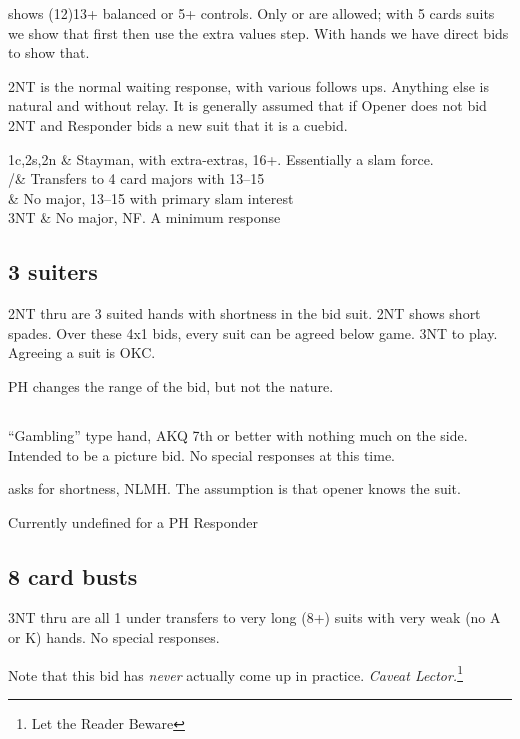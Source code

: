 \documentclass[main]{subfile}
\begin{document}
	 shows (12)13+ balanced or 5+ controls.  Only  or  are allowed; with 5 cards suits we show that first then use the extra values step.  With  hands we have direct bids to show that.
		
	2NT is the normal waiting response, with various follows ups.  Anything else is natural and without relay.  It is generally assumed that if Opener does not bid 2NT and Responder bids a new suit that it is a cuebid.
	
	\begin{bidtable}{1c,2s,2n}
		 & Stayman, with extra-extras, 16+.  Essentially a slam force. \\
		/\hhh& Transfers to 4 card majors with 13--15 \\
		 & No major, 13--15 with primary slam interest \\
		3NT & No major, NF.  A minimum  response \\
	\end{bidtable}	

	
	\subsection{3 suiters}
	
	2NT thru  are 3 suited hands with shortness in the bid suit. 2NT shows short spades. Over these 4x1 bids, every suit can be agreed below game. 3NT to play.  Agreeing a suit is OKC.
	
	PH changes the range of the bid, but not the nature.
		
	\subsection[3S]{}
	
	``Gambling'' type hand, AKQ 7th or better with nothing much on the side. Intended to be a picture bid. No special responses at this time. 

	 asks for shortness, NLMH.  The assumption is that opener knows the suit. 
	
	Currently undefined for a PH Responder
	
	\subsection{8 card busts}
	
	3NT thru  are all 1 under transfers to very long (8+) suits with very weak (no A or K) hands. No special responses.
	
	Note that this bid has \textit{never} actually come up in practice.  \textit{Caveat Lector.}\footnote{Let the Reader Beware}
\end{document}
